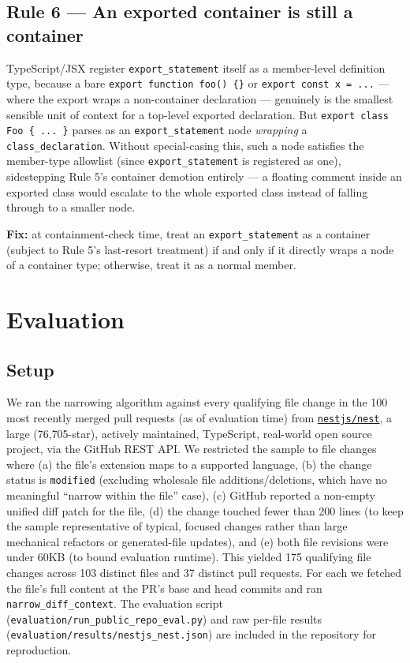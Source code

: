 \documentclass[11pt]{article}
\newcommand{\code}[1]{\texttt{#1}}
\begin{document}
\subsection{Rule 6 --- An exported container is still a container}

TypeScript/JSX register \code{export\_statement} itself as a member-level
definition type, because a bare \code{export function foo() \{\}} or
\code{export const x = ...} --- where the export wraps a non-container
declaration --- genuinely is the smallest sensible unit of context for a top-level
exported declaration. But \code{export class Foo \{ ... \}} parses as an
\code{export\_statement} node \emph{wrapping} a \code{class\_declaration}. Without
special-casing this, such a node satisfies the member-type allowlist (since
\code{export\_statement} is registered as one), sidestepping Rule 5's container
demotion entirely --- a floating comment inside an exported class would escalate
to the whole exported class instead of falling through to a smaller node.

\textbf{Fix:} at containment-check time, treat an \code{export\_statement} as a
container (subject to Rule 5's last-resort treatment) if and only if it directly
wraps a node of a container type; otherwise, treat it as a normal member.

\section{Evaluation}
\label{sec:results}

\subsection{Setup}

We ran the narrowing algorithm against every qualifying file change in the 100
most recently merged pull requests (as of evaluation time) from
\href{https://github.com/nestjs/nest}{\code{nestjs/nest}}, a large
(76{,}705-star), actively maintained, TypeScript, real-world open source project,
via the GitHub REST API. We restricted the sample to file changes where (a) the
file's extension maps to a supported language, (b) the change status is
\code{modified} (excluding wholesale file additions/deletions, which have no
meaningful ``narrow within the file'' case), (c) GitHub reported a non-empty
unified diff patch for the file, (d) the change touched fewer than 200 lines (to
keep the sample representative of typical, focused changes rather than large
mechanical refactors or generated-file updates), and (e) both file revisions were
under 60KB (to bound evaluation runtime). This yielded 175 qualifying file changes
across 103 distinct files and 37 distinct pull requests. For each we fetched the
file's full content at the PR's base and head commits and ran
\code{narrow\_diff\_context}. The evaluation script
(\code{evaluation/run\_public\_repo\_eval.py}) and raw per-file results
(\code{evaluation/results/nestjs\_nest.json}) are included in the repository for
reproduction.
\end{document}
